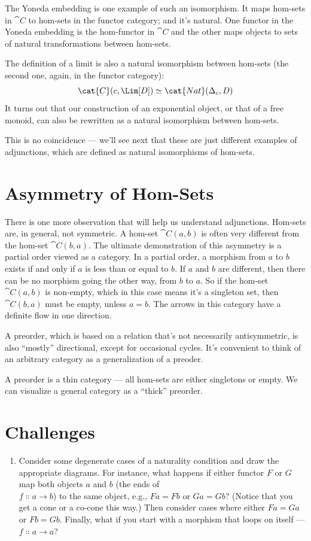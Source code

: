 The Yoneda embedding is one example of such an isomorphism. It maps
hom-sets in $\cat{C}$ to hom-sets in the functor category; and it's
natural. One functor in the Yoneda embedding is the hom-functor in
$\cat{C}$ and the other maps objects to sets of natural transformations
between hom-sets.

The definition of a limit is also a natural isomorphism between hom-sets
(the second one, again, in the functor category):
\[\cat{C}(c, \Lim[D]) \simeq \cat{Nat}(\Delta_c, D)\]
It turns out that our construction of an exponential object, or that of
a free monoid, can also be rewritten as a natural isomorphism between
hom-sets.

This is no coincidence --- we'll see next that these are just different
examples of adjunctions, which are defined as natural isomorphisms of
hom-sets.

\section{Asymmetry of Hom-Sets}

There is one more observation that will help us understand adjunctions.
Hom-sets are, in general, not symmetric. A hom-set $\cat{C}(a, b)$ is
often very different from the hom-set $\cat{C}(b, a)$. The ultimate
demonstration of this asymmetry is a partial order viewed as a category.
In a partial order, a morphism from $a$ to $b$ exists if
and only if $a$ is less than or equal to $b$. If
$a$ and $b$ are different, then there can be no morphism
going the other way, from $b$ to $a$. So if the hom-set
$\cat{C}(a, b)$ is non-empty, which in this case means it's a
singleton set, then $\cat{C}(b, a)$ must be empty, unless
$a = b$. The arrows in this category have a definite flow in
one direction.

A preorder, which is based on a relation that's not necessarily
antisymmetric, is also ``mostly'' directional, except for occasional
cycles. It's convenient to think of an arbitrary category as a
generalization of a preoder.

A preorder is a thin category --- all hom-sets are either singletons or
empty. We can visualize a general category as a ``thick'' preorder.

\section{Challenges}

\begin{enumerate}
\tightlist
\item
  Consider some degenerate cases of a naturality condition and draw the
  appropriate diagrams. For instance, what happens if either functor
  $F$ or $G$ map both objects $a$ and $b$
  (the ends of\\ $f \Colon a \to b$) to the same
  object, e.g., $F a = F b$ or $G a = G b$?
  (Notice that you get a cone or a co-cone this way.) Then consider
  cases where either $F a = G a$ or $F b = G b$.
  Finally, what if you start with a morphism that loops on itself ---
  $f \Colon a \to a$?
\end{enumerate}